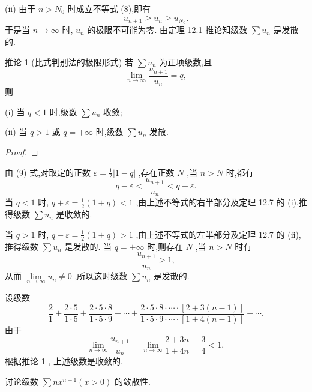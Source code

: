 (ii) 由于 \(n > {N}_{0}\) 时成立不等式 (8),即有
\[
{u}_{n + 1} \geq  {u}_{n} \geq  {u}_{{N}_{0}}.
\]
于是当 \(n \rightarrow  \infty\) 时, \({u}_{n}\) 的极限不可能为零. 由定理 12.1 推论知级数 \(\sum {u}_{n}\) 是发散的.

推论 1 (比式判别法的极限形式) 若 \(\sum {u}_{n}\) 为正项级数,且
\[
\mathop{\lim }\limits_{{n \rightarrow  \infty }}\frac{{u}_{n + 1}}{{u}_{n}} = q, \tag{9}
\]
则

(i) 当 \(q < 1\) 时,级数 \(\sum {u}_{n}\) 收敛;

(ii) 当 \(q > 1\) 或 \(q =  + \infty\) 时,级数 \(\sum {u}_{n}\) 发散.

\begin{proof}

\end{proof}
由 (9) 式,对取定的正数 \(\varepsilon  = \frac{1}{2}\left| {1 - q}\right|\) ,存在正数 \(N\) ,当 \(n > N\) 时,都有
\[
q - \varepsilon  < \frac{{u}_{n + 1}}{{u}_{n}} < q + \varepsilon .
\]
当 \(q < 1\) 时, \(q + \varepsilon  = \frac{1}{2}\left( {1 + q}\right)  < 1\) ,由上述不等式的右半部分及定理 12.7 的 (i),推得级数 \(\sum {u}_{n}\) 是收敛的.

当 \(q > 1\) 时, \(q - \varepsilon  = \frac{1}{2}\left( {1 + q}\right)  > 1\) ,由上述不等式的左半部分及定理 12.7 的 (ii),推得级数 \(\sum {u}_{n}\) 是发散的. 当 \(q =  + \infty\) 时,则存在 \(N\) ,当 \(n > N\) 时有
\[
\frac{{u}_{n + 1}}{{u}_{n}} > 1,
\]
从而 \(\mathop{\lim }\limits_{{n \rightarrow  \infty }}{u}_{n} \neq  0\) ,所以这时级数 \(\sum {u}_{n}\) 是发散的.

\begin{example}

\end{example}
设级数
\[
\frac{2}{1} + \frac{2 \cdot  5}{1 \cdot  5} + \frac{2 \cdot  5 \cdot  8}{1 \cdot  5 \cdot  9} + \cdots  + \frac{2 \cdot  5 \cdot  8 \cdot  \cdots  \cdot  \left\lbrack  {2 + 3\left( {n - 1}\right) }\right\rbrack  }{1 \cdot  5 \cdot  9 \cdot  \cdots  \cdot  \left\lbrack  {1 + 4\left( {n - 1}\right) }\right\rbrack  } + \cdots .
\]
由于
\[
\mathop{\lim }\limits_{{n \rightarrow  \infty }}\frac{{u}_{n + 1}}{{u}_{n}} = \mathop{\lim }\limits_{{n \rightarrow  \infty }}\frac{2 + {3n}}{1 + {4n}} = \frac{3}{4} < 1,
\]
根据推论 1 , 上述级数是收敛的.

\begin{example}

\end{example}
讨论级数 \(\sum n{x}^{n - 1}\left( {x > 0}\right)\) 的敛散性.

